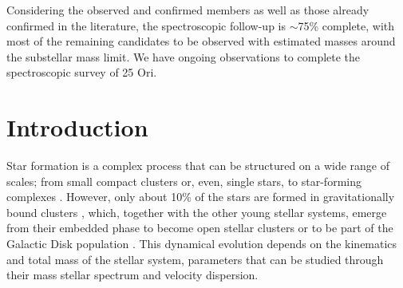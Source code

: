 \documentclass[12pt]{article}
\begin{document}
Considering the observed and confirmed members as well as those already confirmed in the literature, the spectroscopic follow-up is $\sim$75\% complete, with most of the remaining candidates to be observed with estimated masses around the substellar mass limit. We have ongoing observations to complete the spectroscopic survey of 25 Ori.

\newpage
{}

\pagestyle{fancy}

\setlength{\headheight}{30.0pt}

\section{Introduction}
\label{sec:introduction}

Star formation is a complex process that can be structured on a wide range of scales; from small compact clusters or, even, single stars, to star-forming complexes \citep[e.g. ][]{Larson1994,Elmegreen-Efremov1996,Parker-Goodwin2007,Bonnell2011,Bressert2012,Feigelson2013,Vazquez-Semadeni2017,Gouliermis2018}. However, only about 10\% of the stars are formed in gravitationally bound clusters \citep[e.g. ][]{Schweizer2009,Ward-Kruijssen2018}, which, together with the other young stellar systems, emerge from their embedded phase to become open stellar clusters or to be part of the Galactic Disk population \citep{Sills2018,Kuhn2018}. This dynamical evolution depends on the kinematics and total mass of the stellar system, parameters that can be studied through their mass stellar spectrum and velocity dispersion.
\end{document}
